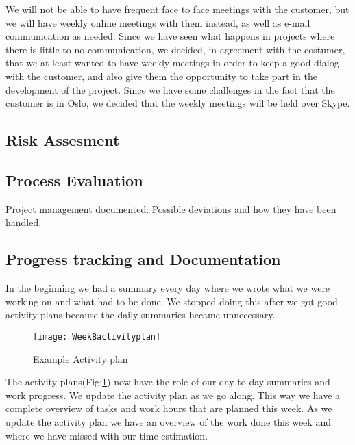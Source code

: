     We will not be able to have frequent face to face meetings with the customer, but we will have weekly online meetings with them instead, as well as e-mail communication as needed. Since we have seen what happens in projects where there is little to no communication, we decided, in agreement with the costumer, that we at least wanted to have weekly meetings in order to keep a good dialog with the customer, and also give them the opportunity to take part in the development of the project. Since we have some challenges in the fact that the customer is in Oslo, we decided that the weekly meetings will be held over Skype.
    
    \subsection{Risk Assesment}\label{Risk Assesment}
    
    \subsection{Process Evaluation}\label{Process Evaluation}
    
    Project management documented: 
    Possible deviations and how they have
been handled. 

    \subsection{Progress tracking and Documentation}\label{Progress tracking and Documentation}
    In the beginning we had a summary every day where we wrote what we were working on and what had to be done. We stopped doing this after we got good activity plans because the daily summaries became unnecessary. 
    
    \begin{figure}[h]
        \centering
        \texttt{[image: Week8activityplan]}
        \caption{Example Activity plan}
        \label{fig:Week8activityplan}
    \end{figure}
    
    The activity plans(Fig:\ref{fig:Week8activityplan}) now have the role of our day to day summaries and work progress. We update the activity plan as we go along. This way we have a complete overview of tasks and work hours that are planned this week. As we update the activity plan we have an overview of the work done this week and where we have missed with our time estimation. 
    
